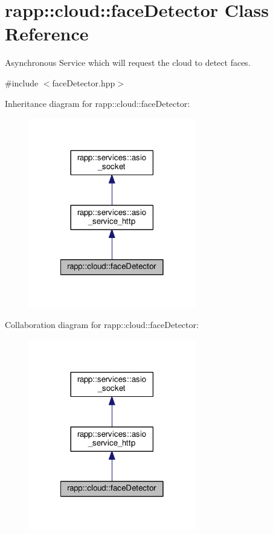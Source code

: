 \hypertarget{classrapp_1_1cloud_1_1faceDetector}{\section{rapp\-:\-:cloud\-:\-:face\-Detector Class Reference}
\label{classrapp_1_1cloud_1_1faceDetector}
}


Asynchronous Service which will request the cloud to detect faces.  




{\ttfamily \#include $<$face\-Detector.\-hpp$>$}



Inheritance diagram for rapp\-:\-:cloud\-:\-:face\-Detector\-:
\nopagebreak
\begin{figure}[H]
\begin{center}
\leavevmode
\includegraphics[width=206pt]{classrapp_1_1cloud_1_1faceDetector__inherit__graph}
\end{center}
\end{figure}


Collaboration diagram for rapp\-:\-:cloud\-:\-:face\-Detector\-:
\nopagebreak
\begin{figure}[H]
\begin{center}
\leavevmode
\includegraphics[width=206pt]{classrapp_1_1cloud_1_1faceDetector__coll__graph}
\end{center}
\end{figure}
